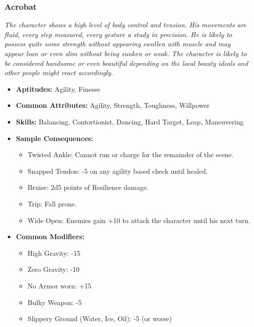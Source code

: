 \subsubsection{Acrobat}\label{Acrobat}
\textit{The character shows a high level of body control and tension. 
His movements are fluid, every step measured, every gesture a study in precision.
He is likely to possess quite some strength without appearing swollen with muscle and may appear lean or even slim without being sunken or weak.
The character is likely to be considered handsome or even beautiful depending on the local beauty ideals and other people might react accordingly.}
\begin{itemize}
	\item \textbf{Aptitudes:} Agility, Finesse
	\item \textbf{Common Attributes:} Agility, Strength, Toughness, Willpower
	\item \textbf{Skills:} Balancing, Contortionist, Dancing, Hard Target, Leap, Maneuvering
	\item \textbf{Sample Consequences:} 
	\begin{itemize}
		\item Twisted Ankle: Cannot run or charge for the remainder of the scene.
		\item Snapped Tendon: -5 on any agility based check until healed.
		\item Bruise: 2d5 points of Resilience damage.
		\item Trip: Fall prone.
		\item Wide Open: Enemies gain +10 to attack the character until his next turn.
	\end{itemize}
	\item \textbf{Common Modifiers:}
	\begin{itemize}
		\item High Gravity: -15
		\item Zero Gravity: -10
		\item No Armor worn: +15
		\item Bulky Weapon: -5
		\item Slippery Ground (Water, Ice, Oil): -5 (or worse)
	\end{itemize}
\end{itemize}

